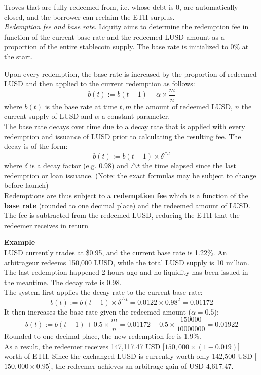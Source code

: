 \documentclass{article}
\begin{document}
Troves that are fully redeemed from, i.e. whose debt is 0, are automatically closed, and the borrower can reclaim the ETH surplus.\\

\textit{Redemption fee and base rate}. Liquity aims to determine the redemption fee in function of the current base rate and the redeemed LUSD amount as a proportion of the entire stablecoin supply. The base rate is initialized to 0\% at the start.

Upon every redemption, the base rate is increased by the proportion of redeemed LUSD and then applied to the current redemption as follows:
$$b(t):=b(t-1)+\alpha\times\frac{m}{n}$$
where $b(t)$ is the base rate at time $t,m$ the amount of redeemed LUSD, $n$ the current supply of LUSD and $\alpha$ a constant parameter.\\

The base rate decays over time due to a decay rate that is applied with every redemption and issuance of LUSD prior to calculating the resulting fee. The decay is of the form:
$$b(t):=b(t-1)\times\delta^{\triangle t}$$
where $\delta$ is a decay factor (e.g. 0.98) and $\triangle t$ the time elapsed since the last redemption or loan issuance. (Note: the exact formulas may be subject to change before launch)\\

Redemptions are thus subject to a \textbf{redemption fee} which is a function of the \textbf{base rate} (rounded to one decimal place) and the redeemed amount of LUSD. The fee is subtracted from the redeemed LUSD, reducing the ETH that the redeemer receives in return\\
\begin{tcolorbox}
\textbf{Example}\\
LUSD currently trades at \$0.95, and the current base rate is 1.22\%. An arbitrageur redeems 150,000 LUSD, while the total LUSD supply is 10 million. The last redemption happened 2 hours ago and no liquidity has been issued in the meantime. The decay rate is 0.98.\\

The system first applies the decay rate to the current base rate:
$$b(t):=b(t-1)\times\delta^{\triangle t}=0.0122\times0.98^2=0.01172$$
It then increases the base rate given the redeemed amount ($\alpha= 0.5$):
$$b(t):=b(t-1)+0.5\times\frac{m}{n}=0.01172+0.5\times\frac{150000}{10000000}=0.01922$$
Rounded to one decimal place, the new redemption fee is 1.9\%.\\

As a result, the redeemer receives 147,117.47 USD [$150,000 \times (1 - 0.019)$] worth of ETH. Since the exchanged LUSD is currently worth only 142,500 USD [$150,000 \times 0.95$], the redeemer achieves an arbitrage gain of USD 4,617.47.
\end{tcolorbox}
\end{document}
